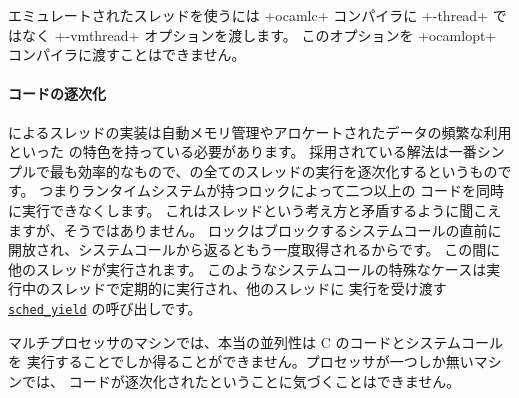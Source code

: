 エミュレートされたスレッドを使うには \ml+ocamlc+ コンパイラに \ml+-thread+ ではなく
\ml+-vmthread+ オプションを渡します。
このオプションを \ml+ocamlopt+ コンパイラに渡すことはできません。

\paragraph{{\ocaml} コードの逐次化}

\ocaml によるスレッドの実装は自動メモリ管理やアロケートされたデータの頻繁な利用といった
\ocaml の特色を持っている必要があります。
採用されている解法は一番シンプルで最も効率的なもので、\ocaml の全てのスレッドの実行を逐次化するというものです。
つまりランタイムシステムが持つロックによって二つ以上の \ocaml コードを同時に実行できなくします。
これはスレッドという考え方と矛盾するように聞こえますが、そうではありません。
ロックはブロックするシステムコールの直前に開放され、システムコールから返るともう一度取得されるからです。
この間に他のスレッドが実行されます。
このようなシステムコールの特殊なケースは実行中のスレッドで定期的に実行され、他のスレッドに
実行を受け渡す \href{http://www.opengroup.org/onlinepubs/007908799/xsh/sched_yield.html}%
{\texttt{sched\_yield}} の呼び出しです。

マルチプロセッサのマシンでは、本当の並列性は C のコードとシステムコールを
実行することでしか得ることができません。プロセッサが一つしか無いマシンでは、
\ocaml コードが逐次化されたということに気づくことはできません。

